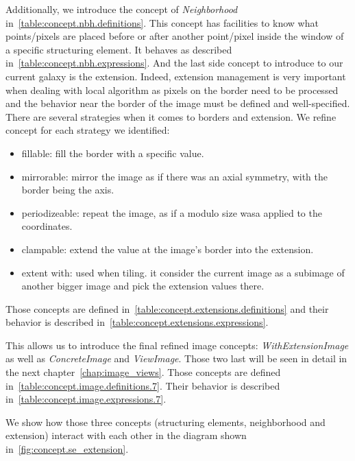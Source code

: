 Additionally, we introduce the concept of \emph{Neighborhood} in~\cref{table:concept.nbh.definitions}. This concept has
facilities to know what points/pixels are placed before or after another point/pixel inside the window of a specific
structuring element. It behaves as described in~\cref{table:concept.nbh.expressions}.
And the last side concept to introduce to our current galaxy is the extension. Indeed, extension management is very
important when dealing with local algorithm as pixels on the border need to be processed and the behavior near the
border of the image must be defined and well-specified. There are several strategies when it comes to borders and extension.
We refine concept for each strategy we identified:
\begin{itemize}
  \item fillable: fill the border with a specific value.
  \item mirrorable: mirror the image as if there was an axial symmetry, with the border being the axis.
  \item periodizeable: repeat the image, as if a modulo size wasa applied to the coordinates.
  \item clampable: extend the value at the image's border into the extension.
  \item extent with: used when tiling. it consider the current image as a subimage of another bigger image and pick the
        extension values there.
\end{itemize}
Those concepts are defined in~\cref{table:concept.extensions.definitions} and their behavior is described
in~\cref{table:concept.extensions.expressions}.

This allows us to introduce the final refined image concepts: \emph{WithExtensionImage} as well as \emph{ConcreteImage}
and \emph{ViewImage}. Those two last will be seen in detail in the next chapter~\ref{chap:image_views}. Those concepts
are defined in~\cref{table:concept.image.definitions.7}. Their behavior is described
in~\cref{table:concept.image.expressions.7}.

We show how those three concepts (structuring elements, neighborhood and extension) interact with each other in the
diagram shown in~\cref{fig:concept.se_extension}.


